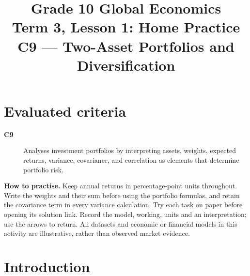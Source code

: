 \makeatletter
{}
\makeatother




\title{Grade 10 Global Economics\\Term 3, Lesson 1: Home Practice\\C9 --- Two-Asset Portfolios and Diversification}
\author{}
\date{}

\maketitle
\setcounter{tocdepth}{1}
\setcounter{secnumdepth}{2}
\label{toc}
\tableofcontents
\section*{Evaluated criteria}
\begin{description}
\item[\textbf{C9}] Analyses investment portfolios by interpreting assets, weights, expected returns, variance, covariance, and correlation as elements that determine portfolio risk.
\end{description}
\textbf{How to practise.} Keep annual returns in percentage-point units throughout. Write the weights and their sum before using the portfolio formulas, and retain the covariance term in every variance calculation. Try each task on paper before opening its solution link. Record the model, working, units and an interpretation; use the arrows to return.
All datasets and economic or financial models in this activity are illustrative, rather than observed market evidence.

\clearpage
\section{Introduction}\label{sec:introduction}
